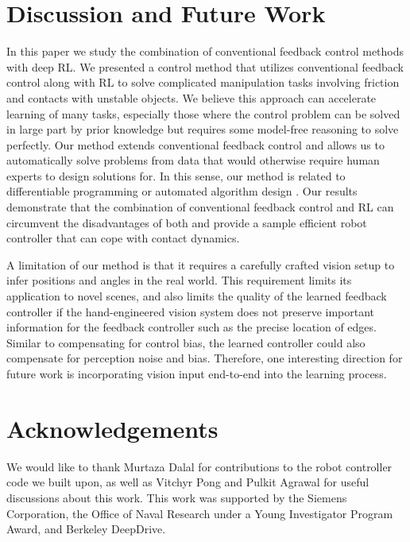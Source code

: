 \section{Discussion and Future Work}\label{sec:discussion}

In this paper we study the combination of conventional feedback control methods with deep RL. 
We presented a control method that utilizes conventional feedback control along with RL to solve complicated manipulation tasks involving friction and contacts with unstable objects. 
We believe this approach can accelerate learning of many tasks, especially those where the control problem can be solved in large part by prior knowledge but requires some model-free reasoning to solve perfectly.
Our method extends conventional feedback control and allows us to automatically solve problems from data that would otherwise require human experts to design solutions for. 
In this sense, our method is related to differentiable programming \cite{wang2018differentiablepogramming} or automated algorithm design \cite{Sunderhauf2018}. 
Our results demonstrate that the combination of conventional feedback control and RL can circumvent the disadvantages of both and provide a sample efficient robot controller that can cope with contact dynamics.

A limitation of our method is that it requires a carefully crafted vision setup to infer positions and angles in the real world. This requirement limits its application to novel scenes, and also limits the quality of the learned feedback controller if the hand-engineered vision system does not preserve important information for the feedback controller such as the precise location of edges. Similar to compensating for control bias, the learned controller could also compensate for perception noise and bias. Therefore, one interesting direction for future work is incorporating vision input end-to-end into the learning process.

\section{Acknowledgements}

We would like to thank Murtaza Dalal for contributions to the robot controller code we built upon, as well as Vitchyr Pong and Pulkit Agrawal for useful discussions about this work. 
This work was supported by the Siemens Corporation, the Office of Naval Research under a Young Investigator Program Award, and Berkeley DeepDrive.

